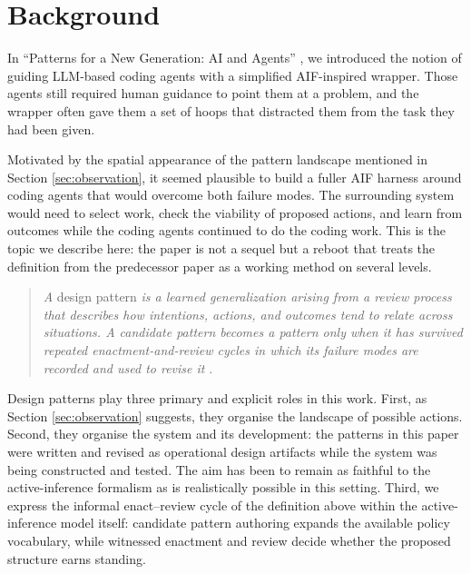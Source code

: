 \section{Background}\label{sec:back}
In ``Patterns for a New Generation: AI and Agents'' \cite{corneli2026patternsnewgenerationai}, we introduced the notion of guiding LLM-based coding agents with a simplified AIF-inspired wrapper.  Those agents still required human guidance to point them at a problem, and the wrapper often gave them a set of hoops that distracted them from the task they had been given.

Motivated by the spatial appearance of the pattern landscape mentioned in Section \ref{sec:observation}, it seemed plausible to build a fuller AIF harness around coding agents that would overcome both failure modes.  The surrounding system would need to select work, check the viability of proposed actions, and learn from outcomes while the coding agents continued to do the coding work.  This is the topic we describe here: the paper is not a sequel but a reboot that treats the definition from the predecessor paper as a working method on several levels.

\begin{quote}
\emph{A} design pattern \emph{is a learned generalization arising from a review process that describes how intentions, actions, and outcomes tend to relate across situations.  A candidate pattern becomes a pattern only when it has survived repeated enactment-and-review cycles in which its failure modes are recorded and used to revise it} \cite{corneli2026patternsnewgenerationai}.
\end{quote}

Design patterns play three primary and explicit roles in this work.  First, as Section \ref{sec:observation} suggests, they organise the landscape of possible actions.  Second, they organise the system and its development: the patterns in this paper were written and revised as operational design artifacts while the system was being constructed and tested.  The aim has been to remain as faithful to the active-inference formalism as is realistically possible in this setting.  Third, we express the informal enact--review cycle of the definition above within the active-inference model itself: candidate pattern authoring expands the available policy vocabulary, while witnessed enactment and review decide whether the proposed structure earns standing.

